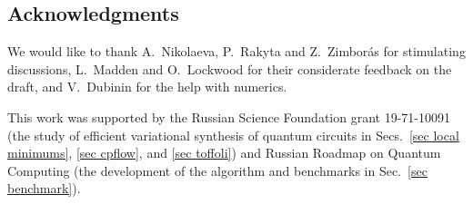 \documentclass[draft, twocolumn, amsfonts, amssymb, aps, nofootinbib]{revtex4-2}
\begin{document}
\subsection*{Acknowledgments}
We would like to thank A.~Nikolaeva, P.~Rakyta and Z.~Zimborás for  stimulating discussions, L.~Madden and O.~Lockwood for their considerate feedback on the draft, and V.~Dubinin for the help with numerics.

This work was supported by the Russian Science Foundation grant 19-71-10091 (the study of efficient variational synthesis of quantum circuits in Secs.~\ref{sec local minimums}, \ref{sec cpflow}, and \ref{sec toffoli}) and Russian Roadmap on Quantum Computing (the development of the algorithm and benchmarks in Sec.~\ref{sec benchmark}).
\appendix
\begin{figure*}
\end{figure*}
\end{document}
